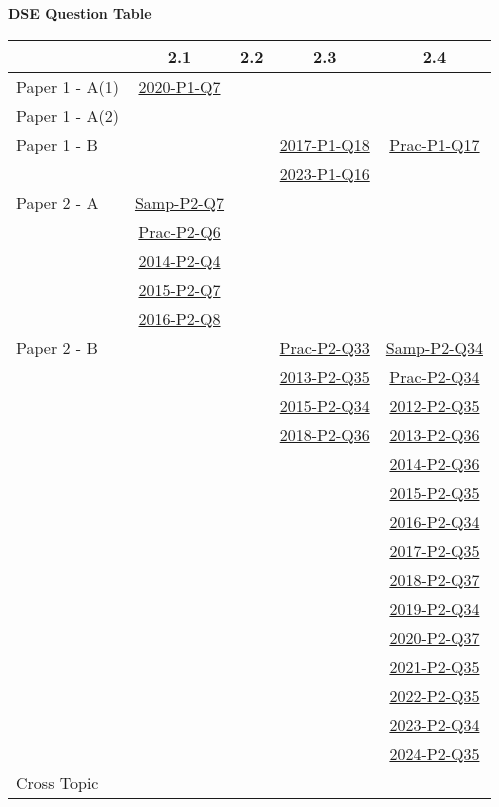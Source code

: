 \documentclass[12pt, a4paper]{article}
\begin{document}
\begin{absolutelynopagebreak}
\begin{center}
\textbf{DSE Question Table}
\end{center}
\begin{center}
\begin{tabular}{|l|c|c|c|c|}
\hline
        & 2.1 & 2.2 & 2.3 & 2.4 \\\hline
\hline
Paper 1 - A(1)& \hyperref[DSE2020-CoreP1-Q07]{2020-P1-Q7} &  &  &  \\
\hline
Paper 1 - A(2)&  &  &  &  \\
\hline
Paper 1 - B&  &  & \hyperref[DSE2017-CoreP1-Q18]{2017-P1-Q18} & \hyperref[DSE2012P-CoreP1-Q17]{Prac-P1-Q17} \\
&  &  & \hyperref[DSE2023-CoreP1-Q16]{2023-P1-Q16} &  \\
\hline
\hline
Paper 2 - A& \hyperref[DSE2012S-CoreP2-Q07]{Samp-P2-Q7} &  &  &  \\
& \hyperref[DSE2012P-CoreP2-Q06]{Prac-P2-Q6} &  &  &  \\
& \hyperref[DSE2014-CoreP2-Q04]{2014-P2-Q4} &  &  &  \\
& \hyperref[DSE2015-CoreP2-Q07]{2015-P2-Q7} &  &  &  \\
& \hyperref[DSE2016-CoreP2-Q08]{2016-P2-Q8} &  &  &  \\
\hline
Paper 2 - B&  &  & \hyperref[DSE2012P-CoreP2-Q33]{Prac-P2-Q33} & \hyperref[DSE2012S-CoreP2-Q34]{Samp-P2-Q34} \\
&  &  & \hyperref[DSE2013-CoreP2-Q35]{2013-P2-Q35} & \hyperref[DSE2012P-CoreP2-Q34]{Prac-P2-Q34} \\
&  &  & \hyperref[DSE2015-CoreP2-Q34]{2015-P2-Q34} & \hyperref[DSE2012-CoreP2-Q35]{2012-P2-Q35} \\
&  &  & \hyperref[DSE2018-CoreP2-Q36]{2018-P2-Q36} & \hyperref[DSE2013-CoreP2-Q36]{2013-P2-Q36} \\
&  &  &  & \hyperref[DSE2014-CoreP2-Q36]{2014-P2-Q36} \\
&  &  &  & \hyperref[DSE2015-CoreP2-Q35]{2015-P2-Q35} \\
&  &  &  & \hyperref[DSE2016-CoreP2-Q34]{2016-P2-Q34} \\
&  &  &  & \hyperref[DSE2017-CoreP2-Q35]{2017-P2-Q35} \\
&  &  &  & \hyperref[DSE2018-CoreP2-Q37]{2018-P2-Q37} \\
&  &  &  & \hyperref[DSE2019-CoreP2-Q34]{2019-P2-Q34} \\
&  &  &  & \hyperref[DSE2020-CoreP2-Q37]{2020-P2-Q37} \\
&  &  &  & \hyperref[DSE2021-CoreP2-Q35]{2021-P2-Q35} \\
&  &  &  & \hyperref[DSE2022-CoreP2-Q35]{2022-P2-Q35} \\
&  &  &  & \hyperref[DSE2023-CoreP2-Q34]{2023-P2-Q34} \\
&  &  &  & \hyperref[DSE2024-CoreP2-Q35]{2024-P2-Q35} \\
\hline
\hline
Cross Topic&  &  &  &  \\
\hline
\end{tabular}
\end{center}
\end{absolutelynopagebreak}
\end{document}
